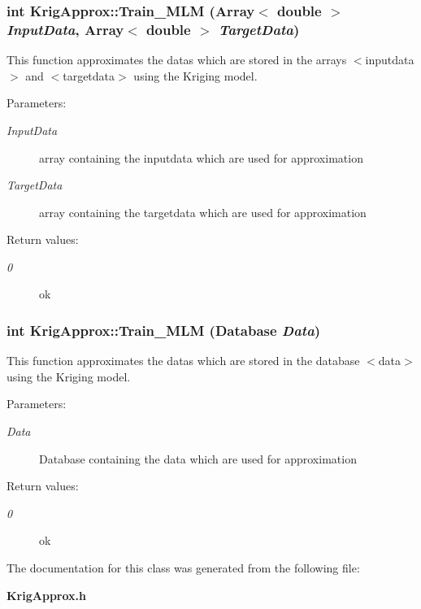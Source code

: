 \subsubsection{\setlength{\rightskip}{0pt plus 5cm}int Krig\-Approx::Train\_\-MLM (Array$<$ double $>$ {\em Input\-Data}, Array$<$ double $>$ {\em Target\-Data})}\label{classKrigApprox_a9}


This function approximates the datas which are stored in the arrays $<$inputdata$>$ and $<$targetdata$>$ using the Kriging model. 

\begin{Desc}
\item[Parameters:]
\begin{description}
\item[{\em Input\-Data}]array containing the inputdata which are used for approximation \item[{\em Target\-Data}]array containing the targetdata which are used for approximation \end{description}
\end{Desc}
\begin{Desc}
\item[Return values:]
\begin{description}
\item[{\em 0}]ok \end{description}
\end{Desc}
\subsubsection{\setlength{\rightskip}{0pt plus 5cm}int Krig\-Approx::Train\_\-MLM (Database {\em Data})}\label{classKrigApprox_a8}


This function approximates the datas which are stored in the database $<$data$>$ using the Kriging model. 

\begin{Desc}
\item[Parameters:]
\begin{description}
\item[{\em Data}]Database containing the data which are used for approximation \end{description}
\end{Desc}
\begin{Desc}
\item[Return values:]
\begin{description}
\item[{\em 0}]ok \end{description}
\end{Desc}


The documentation for this class was generated from the following file:\begin{CompactItemize}
\item 
{\bf Krig\-Approx.h}\end{CompactItemize}
